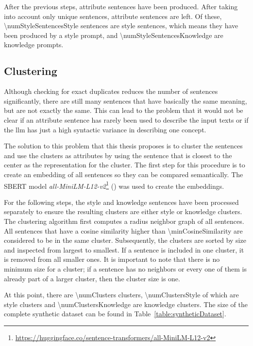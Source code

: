 After the previous steps, \numStyleSentencesNotUniqueText{} attribute sentences have been produced. After taking into account only unique sentences, \numStyleSentencesText{} attribute sentences are left. Of these, \num{\numStyleSentencesStyle} sentences are style sentences, which means they have been produced by a style prompt, and \num{\numStyleSentencesKnowledge} are knowledge prompts.

\subsection{Clustering}
\label{sec:experiments:setup:clustering}
Although checking for exact duplicates reduces the number of sentences significantly, there are still many sentences that have basically the same meaning, but are not exactly the same. This can lead to the problem that it would not be clear if an attribute sentence has rarely been used to describe the input texts or if the \ac{llm} has just a high syntactic variance in describing one concept.

The solution to this problem that this thesis proposes is to cluster the sentences and use the clusters as attributes by using the sentence that is closest to the center as the representation for the cluster.
The first step for this procedure is to create an embedding of all sentences so they can be compared semantically. The SBERT model \textit{all-MiniLM-L12-v2}\footnote{\url{https://huggingface.co/sentence-transformers/all-MiniLM-L12-v2}} (\cite{reimersSentenceBERTSentenceEmbeddings2019}) was used to create the embeddings.

For the following steps, the style and knowledge sentences have been processed separately to ensure the resulting clusters are either style or knowledge clusters.
The clustering algorithm first computes a radius neighbor graph of all sentences. All sentences that have a cosine similarity higher than \num{\minCosineSimilarity} are considered to be in the same cluster. Subsequently, the clusters are sorted by size and inspected from largest to smallest. If a sentence is included in one cluster, it is removed from all smaller ones. It is important to note that there is no minimum size for a cluster; if a sentence has no neighbors or every one of them is already part of a larger cluster, then the cluster size is one.


At this point, there are \num{\numClusters} clusters, \num{\numClustersStyle} of which are style clusters and \num{\numClustersKnowledge} are knowledge clusters. The size of the complete synthetic dataset can be found in Table~\ref{table:syntheticDataset}.

